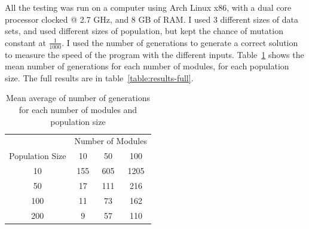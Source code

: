 All the testing was run on a computer using Arch Linux x86, with 
a dual core processor clocked @ 2.7 GHz, and 8 GB of RAM.
I used 3 different sizes of data sets, and used different sizes of population, 
but kept the chance of mutation constant at \( \frac{1}{1000} \).
I used the number of generations to generate a correct solution to measure the
speed of the program with the different inputs.
Table~\ref*{table:results-mean} shows the mean number of generations for each
number of modules, for each population size.
The full results are in table~\ref*{table:results-full}.

\begin{table}[ht]
	\centering
	\begin{tabular}{c|ccc}
		\toprule
		& \multicolumn{3}{c}{Number of Modules} \\
		Population Size & 10 & 50 & 100 \\
		\midrule
		10 & 155 & 605 & 1205 \\
		50 & 17 & 111 & 216 \\
		100 & 11 & 73 & 162 \\
		200 & 9 & 57 & 110 \\
		\bottomrule
	\end{tabular}
	\caption{Mean average of number of generations for each number of modules
		and population size}
	\label{table:results-mean}
\end{table}

